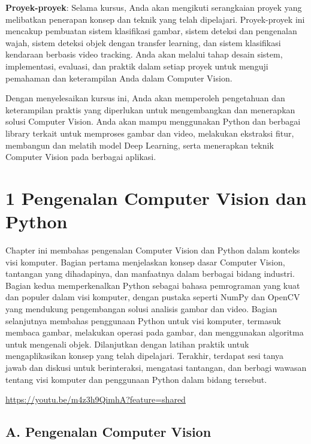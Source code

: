 \documentclass[
  letterpaper,
  DIV=11,
  numbers=noendperiod]{scrreprt}
\begin{document}
\textbf{Proyek-proyek}: Selama kursus, Anda akan mengikuti serangkaian
proyek yang melibatkan penerapan konsep dan teknik yang telah
dipelajari. Proyek-proyek ini mencakup pembuatan sistem klasifikasi
gambar, sistem deteksi dan pengenalan wajah, sistem deteksi objek dengan
transfer learning, dan sistem klasifikasi kendaraan berbasis video
tracking. Anda akan melalui tahap desain sistem, implementasi, evaluasi,
dan praktik dalam setiap proyek untuk menguji pemahaman dan keterampilan
Anda dalam Computer Vision.

Dengan menyelesaikan kursus ini, Anda akan memperoleh pengetahuan dan
keterampilan praktis yang diperlukan untuk mengembangkan dan menerapkan
solusi Computer Vision. Anda akan mampu menggunakan Python dan berbagai
library terkait untuk memproses gambar dan video, melakukan ekstraksi
fitur, membangun dan melatih model Deep Learning, serta menerapkan
teknik Computer Vision pada berbagai aplikasi.

\hypertarget{pengenalan-computer-vision-dan-python}{%
\chapter*{1 Pengenalan Computer Vision dan
Python}\label{pengenalan-computer-vision-dan-python}}


Chapter ini membahas pengenalan Computer Vision dan Python dalam konteks
visi komputer. Bagian pertama menjelaskan konsep dasar Computer Vision,
tantangan yang dihadapinya, dan manfaatnya dalam berbagai bidang
industri. Bagian kedua memperkenalkan Python sebagai bahasa pemrograman
yang kuat dan populer dalam visi komputer, dengan pustaka seperti NumPy
dan OpenCV yang mendukung pengembangan solusi analisis gambar dan video.
Bagian selanjutnya membahas penggunaan Python untuk visi komputer,
termasuk membaca gambar, melakukan operasi pada gambar, dan menggunakan
algoritma untuk mengenali objek. Dilanjutkan dengan latihan praktik
untuk mengaplikasikan konsep yang telah dipelajari. Terakhir, terdapat
sesi tanya jawab dan diskusi untuk berinteraksi, mengatasi tantangan,
dan berbagi wawasan tentang visi komputer dan penggunaan Python dalam
bidang tersebut.

\url{https://youtu.be/m4z3h9QimhA?feature=shared}

\hypertarget{a.-pengenalan-computer-vision}{%
\section*{A. Pengenalan Computer
Vision}\label{a.-pengenalan-computer-vision}}
\end{document}
